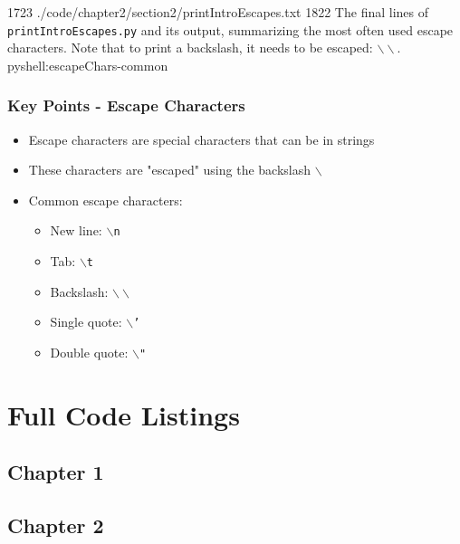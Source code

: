 \documentclass[oneside]{book}
\begin{document}
{17}{23}
{./code/chapter2/section2/printIntroEscapes.txt}
{18}{22}
{The final lines of \texttt{printIntroEscapes.py} and its output, summarizing the most often used escape characters. Note that to print a backslash, it needs to be escaped: $\backslash\backslash$.}
{pyshell:escapeChars-common}

\FloatBarrier

\subsubsection*{Key Points - Escape Characters}
\begin{itemize}
    \item Escape characters are special characters that can be in strings
    \item These characters are "escaped" using the backslash \texttt{$\backslash$}
    \item Common escape characters:
    \begin{itemize}
        \item New line: \texttt{$\backslash$n}
        \item Tab: \texttt{$\backslash$t}
        \item Backslash: \texttt{$\backslash\backslash$}
        \item Single quote: \texttt{$\backslash$'}
        \item Double quote: \texttt{$\backslash$"}
    \end{itemize}
\end{itemize}


\section{Full Code Listings}

\subsection*{Chapter 1}


\FloatBarrier

\subsection*{Chapter 2}
\end{document}
